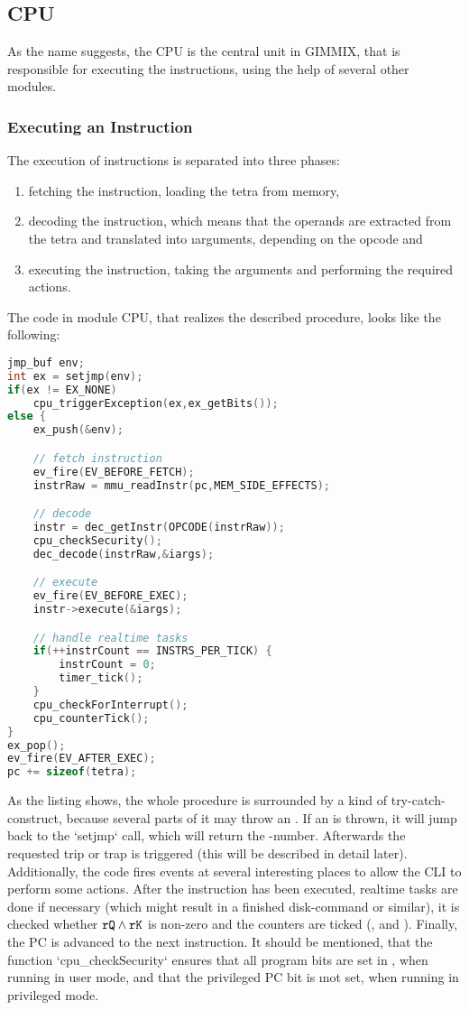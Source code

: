 \subsection{CPU}

As the name suggests, the CPU is the central unit in GIMMIX, that is responsible for executing the instructions, using the help of several other modules.

\subsubsection{Executing an Instruction}

The execution of instructions is separated into three phases:
\begin{enumerate}
	\item fetching the instruction, \ie loading the tetra from memory,
	\item decoding the instruction, which means that the operands are extracted from the tetra and translated into \i{arguments}, depending on the opcode and
	\item executing the instruction, taking the arguments and performing the required actions.
\end{enumerate}
The code in module CPU, that realizes the described procedure, looks like the following:
\begin{lstlisting}[language=C,caption=Executing an instruction (slightly shortened)]
jmp_buf env;
int ex = setjmp(env);
if(ex != EX_NONE)
	cpu_triggerException(ex,ex_getBits());
else {
	ex_push(&env);

	// fetch instruction
	ev_fire(EV_BEFORE_FETCH);
	instrRaw = mmu_readInstr(pc,MEM_SIDE_EFFECTS);

	// decode
	instr = dec_getInstr(OPCODE(instrRaw));
	cpu_checkSecurity();
	dec_decode(instrRaw,&iargs);

	// execute
	ev_fire(EV_BEFORE_EXEC);
	instr->execute(&iargs);

	// handle realtime tasks
	if(++instrCount == INSTRS_PER_TICK) {
		instrCount = 0;
		timer_tick();
	}
	cpu_checkForInterrupt();
	cpu_counterTick();
}
ex_pop();
ev_fire(EV_AFTER_EXEC);
pc += sizeof(tetra);
\end{lstlisting}
As the listing shows, the whole procedure is surrounded by a kind of try-catch-construct, because several parts of it may throw an . If an  is thrown, it will jump back to the `setjmp` call, which will return the -number. Afterwards the requested trip or trap is triggered (this will be described in detail later). Additionally, the code fires events at several interesting places to allow the CLI to perform some actions. After the instruction has been executed, realtime tasks are done if necessary (which might result in a finished disk-command or similar), it is checked whether ${\tt rQ}\land{\tt rK}$ is non-zero and the counters are ticked (,  and ). Finally, the \gls{PC} is advanced to the next instruction. It should be mentioned, that the function `cpu_checkSecurity` ensures that all program bits are set in , when running in user mode, and that the privileged \gls{PC} bit is \i{not} set, when running in privileged mode.

